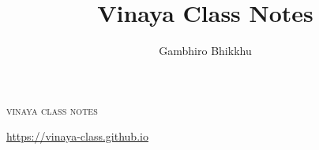 \documentclass[11pt]{memoir}
\title{Vinaya Class Notes}
\author{Gambhiro Bhikkhu}
\begin{document}
\frontmatter

{\LARGE\scshape\MakeTextLowercase{Vinaya Class Notes}}

\href{https://vinaya-class.github.io}{https://vinaya-class.github.io}

\tableofcontents*



\mainmatter




























\backmatter




\end{document}
